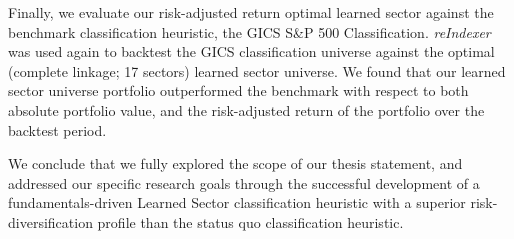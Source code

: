 \documentclass[../main.tex]{subfiles}
\begin{document}
Finally, we evaluate our risk-adjusted return optimal learned sector against the benchmark classification heuristic, the GICS S\&P 500 Classification. \textit{reIndexer} was used again to backtest the GICS classification universe against the optimal (complete linkage; 17 sectors) learned sector universe. We found that our learned sector universe portfolio outperformed the benchmark with respect to both absolute portfolio value, and the risk-adjusted return of the portfolio over the backtest period.

We conclude that we fully explored the scope of our thesis statement, and addressed our specific research goals through the successful development of a fundamentals-driven Learned Sector classification heuristic with a superior risk-diversification profile than the status quo classification heuristic.
\end{document}
